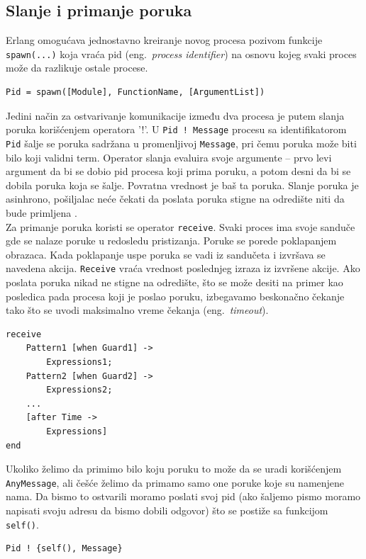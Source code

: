 \documentclass[a4paper]{article}
\begin{document}
\subsection{Slanje i primanje poruka}
Erlang omogućava jednostavno kreiranje novog procesa pozivom funkcije {\texttt{spawn(...)}} koja vraća pid (eng.~{\em process identifier}) na osnovu kojeg svaki proces može da razlikuje ostale procese.
\begin{verbatim}
Pid = spawn([Module], FunctionName, [ArgumentList]) 
\end{verbatim}

Jedini način za ostvarivanje komunikacije između dva procesa je putem slanja poruka korišćenjem operatora '!'. U {\texttt{Pid ! Message}} procesu sa identifikatorom {\texttt{Pid}} šalje se poruka sadržana u promenljivoj {\texttt{Message}}, 
pri čemu poruka može biti bilo koji validni term. 
Operator slanja evaluira svoje argumente – prvo levi argument da bi se dobio pid procesa koji prima poruku, 
a potom desni da bi se dobila poruka koja se šalje. 
Povratna vrednost je baš ta poruka.
Slanje poruka je asinhrono, pošiljalac neće čekati da poslata poruka stigne na odredište niti da bude primljena \cite{book_joe, book_concurrent}.\\

Za primanje poruka koristi se operator {\texttt{receive}}. 
Svaki proces ima svoje sanduče gde se nalaze poruke u redosledu pristizanja. 
Poruke se porede poklapanjem obrazaca. 
Kada poklapanje uspe poruka se vadi iz sandučeta i izvršava se navedena akcija. 
{\texttt{Receive}} vraća vrednost poslednjeg izraza iz izvršene akcije.
Ako poslata poruka nikad ne stigne na odredište, 
što se može desiti na primer kao posledica pada procesa koji je poslao poruku, 
izbegavamo beskonačno čekanje tako što se uvodi maksimalno vreme čekanja (eng.~{\em timeout}).
\begin{verbatim}
receive
    Pattern1 [when Guard1] ->
        Expressions1;
    Pattern2 [when Guard2] ->
        Expressions2;
	... 
	[after Time -> 
		Expressions]
end
\end{verbatim}

Ukoliko želimo da primimo bilo koju poruku to može da se uradi korišćenjem {\texttt{AnyMessage}}, 
ali češće želimo da primamo samo one poruke koje su namenjene nama. 
Da bismo to ostvarili moramo poslati svoj pid 
(ako šaljemo pismo moramo napisati svoju adresu da bismo dobili odgovor) 
što se postiže sa funkcijom {\texttt{self()}}.
\begin{verbatim}
Pid ! {self(), Message}
\end{verbatim}
\end{document}
